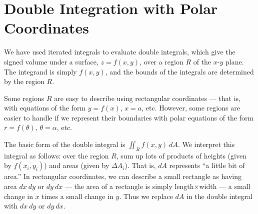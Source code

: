 \section{Double Integration with Polar Coordinates}\label{sec:double_int_polar}

We have used iterated integrals to evaluate double integrals, which give the signed volume under a surface, $z=f(x,y)$, over a region $R$ of the $x$-$y$ plane. The integrand is simply $f(x,y)$, and the bounds of the integrals are determined by the region $R$.

Some regions $R$ are easy to describe using rectangular coordinates --- that is, with equations of the form $y=f(x)$, $x=a$, etc. However, some regions are easier to handle if we represent their boundaries with polar equations of the form $r=f(\theta)$, $\theta = \alpha$, etc. 

The basic form of the double integral is $\iint_R f(x,y)\ dA$. We interpret this integral as follows: over the region $R$, sum up lots of products of heights (given by $f(x_i,y_i)$) and areas (given by $\Delta A_i$). That is, $dA$ represents ``a little bit of area.'' In rectangular coordinates, we can describe a small rectangle as having area $dx\ dy$ or $dy\ dx$ --- the area of a rectangle is simply length$\times$width --- a small change in $x$ times a small change in $y$. Thus we replace $dA$ in the double integral with $dx\ dy$ or $dy\ dx$.

